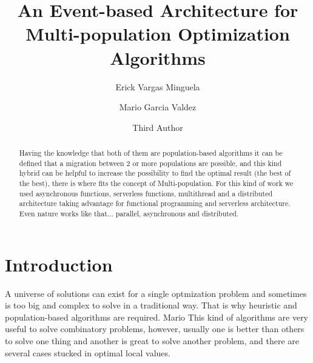 \documentclass[runningheads]{llncs}
\begin{document}
%
\title{An Event-based Architecture for Multi-population Optimization Algorithms}
%
%
\author{Erick Vargas Minguela \and
Mario Garcia Valdez \and
Third Author}
%
%
%
\maketitle              %
%
\begin{abstract}
    Having the knowledge that both of them are population-based algorithms it
    can be defined that a migration between 2 or more populations are possible,
    and this kind hybrid can be helpful to increase the possibility to find the
    optimal result (the best of the best), there is where fits the concept of
    Multi-population. For this kind of work we used asynchronous functions,
    serverless functions, multithread and a distributed architecture taking
    advantage for functional programming and serverless architecture. Even
    nature works like that... parallel, asynchronous and distributed.



\end{abstract}
%
%
%
\section{Introduction}
A universe of solutions can exist for a single optmization problem and sometimes
is too big and complex to solve in a traditional way. That is why heuristic and
population-based algorithms are required. %
Mario This kind of algorithms are very useful to solve combinatory problems,
however, usually one is better than others to solve one thing and another is
great to solve another problem, and there are several cases stucked in optimal
local values. %
\end{document}
